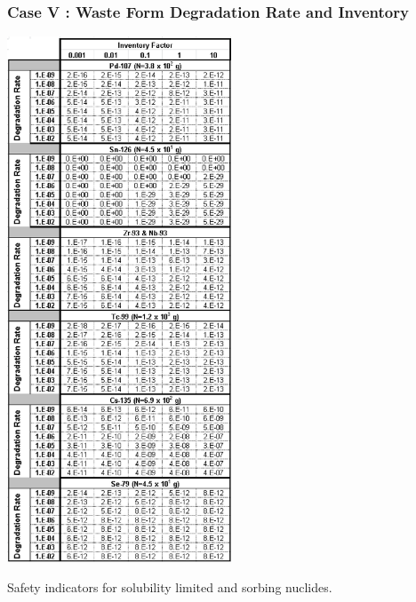 \begin{frame}[c]
  \frametitle{Case V : Waste Form Degradation Rate and Inventory}

\begin{table}[h!]
\centering
\includegraphics[width=0.5\textwidth]{WFDegAndInv/IndicatorsSolLimSorbing.eps}
\caption{Safety indicators for solubility limited and sorbing nuclides.} 
\label{tab:WFDegIndicatorsPdSnZrNb}
\end{table}

\end{frame}


